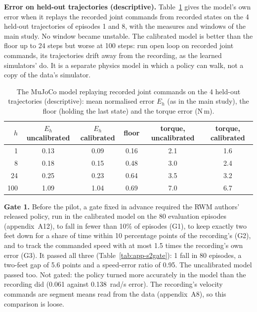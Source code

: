 \textbf{Error on held-out trajectories (descriptive).} Table~\ref{tab:app-s2fid} gives the model's own error when it
replays the recorded joint commands from recorded states on the 4 held-out trajectories of episodes 1
and 8, with the measures and windows of the main study. No window became unstable. The calibrated model is better than
the floor up to 24 steps but worse at 100 steps: run open loop on recorded joint commands, its trajectories drift
away from the recording, as the learned simulators' do. It is a separate physics model in which a policy can walk,
not a copy of the data's simulator.

\begin{table}[h]
\centering
\caption{The MuJoCo model replaying recorded joint commands on the 4 held-out trajectories
(descriptive): mean normalised error $E_h$ (as in the main study), the floor (holding the last state) and the torque
error (N\,m).}
\label{tab:app-s2fid}
\footnotesize
\begin{tabular}{@{}rccccc@{}}
\toprule
$h$ & $E_h$ uncalibrated & $E_h$ calibrated & floor & torque, uncalibrated & torque, calibrated \\
\midrule
1 & 0.13 & 0.09 & 0.16 & 2.1 & 1.6 \\
8 & 0.18 & 0.15 & 0.48 & 3.0 & 2.4 \\
24 & 0.25 & 0.23 & 0.64 & 3.5 & 3.2 \\
100 & 1.09 & 1.04 & 0.69 & 7.0 & 6.7 \\
\bottomrule
\end{tabular}
\end{table}

\textbf{Gate 1.} Before the pilot, a gate fixed in advance required the RWM authors' released policy, run in the
calibrated model on the 80 evaluation episodes (appendix~A12), to fall in fewer than 10\% of episodes (G1),
to keep exactly two feet down for a share of time within 10 percentage points of the recording's (G2), and to track
the commanded speed with at most 1.5 times the recording's own error (G3). It passed all three
(Table~\ref{tab:app-s2gate}): 1 fall in 80 episodes, a two-feet gap of 5.6
points and a speed-error ratio of 0.95. The uncalibrated model passed too. Not gated: the policy
turned more accurately in the model than the recording did (0.061 against 0.138~rad/s
error). The recording's velocity commands are segment means read from the data (appendix~A8), so this comparison is
loose.

